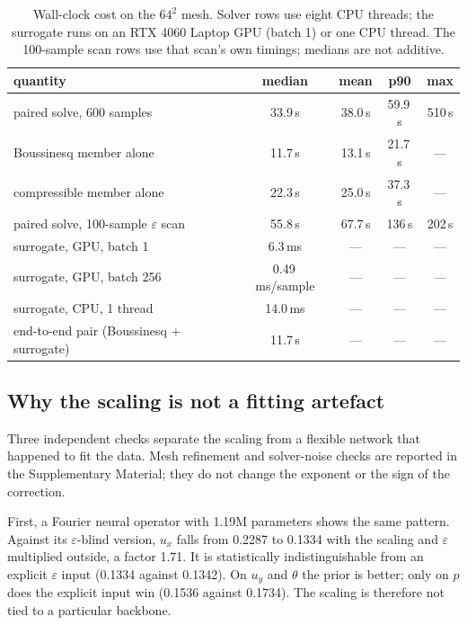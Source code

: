 \documentclass[preprint,11pt,a4paper,times,doubleblind]{elsarticle}
\begin{document}
\begin{table}[htbp]
\centering
\caption{Wall-clock cost on the $64^2$ mesh. Solver rows use eight CPU threads; the surrogate
runs on an RTX 4060 Laptop GPU (batch 1) or one CPU thread. The 100-sample scan rows use that
scan's own timings; medians are not additive.}
\label{tab:cost}
\setlength{\tabcolsep}{4pt}
\begin{tabular}{@{}lcccc@{}}
\toprule
quantity & median & mean & p90 & max\\
\midrule
paired solve, 600 samples & 33.9\,s & 38.0\,s & 59.9\,s & 510\,s\\
Boussinesq member alone & 11.7\,s & 13.1\,s & 21.7\,s & ---\\
compressible member alone & 22.3\,s & 25.0\,s & 37.3\,s & ---\\
paired solve, 100-sample $\varepsilon$ scan & 55.8\,s & 67.7\,s & 136\,s & 202\,s\\
surrogate, GPU, batch 1 & 6.3\,ms & --- & --- & ---\\
surrogate, GPU, batch 256 & 0.49\,ms/sample & --- & --- & ---\\
surrogate, CPU, 1 thread & 14.0\,ms & --- & --- & ---\\
end-to-end pair (Boussinesq + surrogate) & 11.7\,s & --- & --- & ---\\
\bottomrule
\end{tabular}
\end{table}

\subsection{Why the scaling is not a fitting artefact}
\label{sec:baselines}
\label{sec:checks}

Three independent checks separate the scaling from a flexible network that happened to
fit the data.
\label{sec:noise}
Mesh refinement and solver-noise checks are reported in the Supplementary Material; they do not
change the exponent or the sign of the correction.

First, a Fourier neural operator with 1.19M parameters shows the same pattern. Against its
$\varepsilon$-blind version, $u_x$ falls from 0.2287 to 0.1334 with the scaling and
$\varepsilon$ multiplied outside, a factor 1.71. It is statistically indistinguishable from an
explicit $\varepsilon$ input (0.1334 against 0.1342). On $u_y$ and $\theta$ the prior is
better; only on $p$ does the explicit input win (0.1536 against 0.1734). The scaling is
therefore not tied to a particular backbone.
\end{document}
